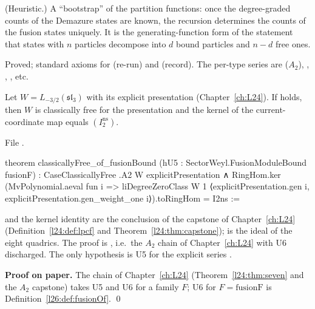 \begin{physics}
(Heuristic.) A ``bootstrap'' of the partition functions: once the degree-graded counts of the Demazure states are known,
the recursion determines the counts of the fusion states uniquely. It is the generating-function form of the statement
that states with $n$ particles decompose into $d$ bound particles and $n-d$ free ones.
\end{physics}

\begin{status}
Proved; standard axioms for  (re-run) and  (record). The per-type series are  ($A_2$), ,
, , etc.
\end{status}

\begin{theorem}\label{l26:thm:a2u5}
Let $W=L_{-3/2}(\mathfrak{sl}_3)$ with its explicit presentation (Chapter~\ref{ch:L24}). If
 holds, then $W$ is classically free for the presentation and the kernel of
the current-coordinate map equals $(I_2^{\mathrm{ns}})$.
\end{theorem}
\noindent File .
\begin{leancode}
theorem classicallyFree_of_fusionBound (hU5 : SectorWeyl.FusionModuleBound fusionF) :
    CaseClassicallyFree .A2 W explicitPresentation ∧
      RingHom.ker (MvPolynomial.aeval fun i =>
        liDegreeZeroClass W 1 ⟨explicitPresentation.gen i,
          explicitPresentation.gen_weight_one i⟩).toRingHom = I2ns :=
\end{leancode}

\begin{dictionary}
 and the kernel identity are the conclusion of the capstone of
Chapter~\ref{ch:L24} (Definition~\ref{l24:def:lpcf} and Theorem~\ref{l24:thm:capstone});  is the ideal of the
eight quadrics. The proof is , i.e.\ the
$A_2$ chain of Chapter~\ref{ch:L24} with U6 discharged. The only hypothesis is U5 for the explicit series .
\end{dictionary}

\textbf{Proof on paper.} The chain of Chapter~\ref{ch:L24} (Theorem~\ref{l24:thm:seven} and the $A_2$ capstone) takes U5 and
U6 for a family $F$; U6 for $F=\mathrm{fusionF}$ is Definition~\ref{l26:def:fusionOf}. \qed

